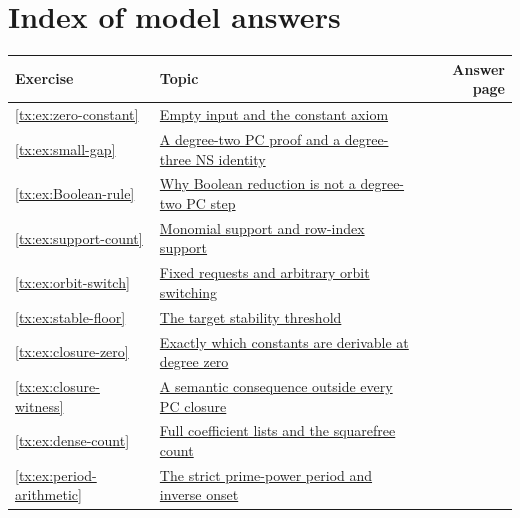 \documentclass[11pt,a4paper,oneside,openany]{book}
\theoremstyle{definition}\newtheorem{definition}[theorem]{Definition}
\theoremstyle{remark}\newtheorem{remark}[theorem]{Remark}
\numberwithin{equation}{chapter}
\begin{document}
\section*{Index of model answers}
\begin{longtable}{@{}lp{}r@{}}
\toprule
Exercise & Topic & Answer page\\
\midrule

\ref{tx:ex:zero-constant} & \hyperref[tx:ans:zero-constant]{Empty input and the constant axiom} & \pageref{tx:ans:zero-constant}\\

\ref{tx:ex:small-gap} & \hyperref[tx:ans:small-gap]{A degree-two PC proof and a degree-three NS identity} & \pageref{tx:ans:small-gap}\\

\ref{tx:ex:Boolean-rule} & \hyperref[tx:ans:Boolean-rule]{Why Boolean reduction is not a degree-two PC step} & \pageref{tx:ans:Boolean-rule}\\

\ref{tx:ex:support-count} & \hyperref[tx:ans:support-count]{Monomial support and row-index support} & \pageref{tx:ans:support-count}\\

\ref{tx:ex:orbit-switch} & \hyperref[tx:ans:orbit-switch]{Fixed requests and arbitrary orbit switching} & \pageref{tx:ans:orbit-switch}\\

\ref{tx:ex:stable-floor} & \hyperref[tx:ans:stable-floor]{The target stability threshold} & \pageref{tx:ans:stable-floor}\\

\ref{tx:ex:closure-zero} & \hyperref[tx:ans:closure-zero]{Exactly which constants are derivable at degree zero} & \pageref{tx:ans:closure-zero}\\

\ref{tx:ex:closure-witness} & \hyperref[tx:ans:closure-witness]{A semantic consequence outside every PC closure} & \pageref{tx:ans:closure-witness}\\

\ref{tx:ex:dense-count} & \hyperref[tx:ans:dense-count]{Full coefficient lists and the squarefree count} & \pageref{tx:ans:dense-count}\\

\ref{tx:ex:period-arithmetic} & \hyperref[tx:ans:period-arithmetic]{The strict prime-power period and inverse onset} & \pageref{tx:ans:period-arithmetic}\\


\end{longtable}
\end{document}
